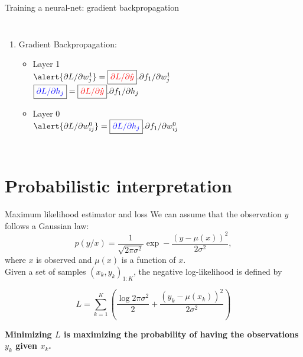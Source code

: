 \documentclass[handout]{beamer}
\begin{document}
\begin{frame}{Training a neural-net: gradient backpropagation}
\begin{columns}
\begin{enumerate}[<+->]
    \item \alert{Gradient Backpropagation:}
    \begin{itemize}
   \item Layer 1\\
   $\alert{\partial L/\partial w_j^1} = 
   \boxed{\color{red}\partial L/\partial \hat{y}}.
   \partial f_1 / \partial w^1_j$\\
   
   $ \boxed{\color{blue}\partial L/\partial h_j} = 
    \boxed{\color{red}\partial L/\partial \hat{y}}. 
   \partial f_1 / \partial h_j$
   
   \item Layer 0\\
   $\alert{\partial L/\partial w^0_{ij}}=
  \boxed{\color{blue}\partial L/\partial h_j}
   .\partial f_1 / \partial w^0_{ij}  $
    
    \end{itemize}
\end{enumerate}

\end{columns}

\end{frame}

\section{Probabilistic interpretation}
\begin{frame}{Maximum likelihood estimator and loss}
    We can assume that the observation $y$ follows a Gaussian law:
    $$
p(y/x) = \frac{1}{\sqrt{2\pi\sigma^2}}\exp -\frac{(y - \mu(x))^2}{2\sigma^2},
    $$
    where $x$ is observed and $\mu(x)$ is a function of $x$.\\
    
    Given a set of samples $(x_k,y_k)_{1:K}$, the negative log-likelihood is defined by
    
    $$
L = \sum_{k=1}^{K} \left(\frac{\log 2\pi\sigma^2}{2} + \frac{(y_k - \mu(x_k))^2}{2\sigma^2}\right)
$$

\alert{\bf Minimizing $L$ is maximizing the probability of having the observations $y_k$ given $x_k$.}
\end{frame}
\end{document}
